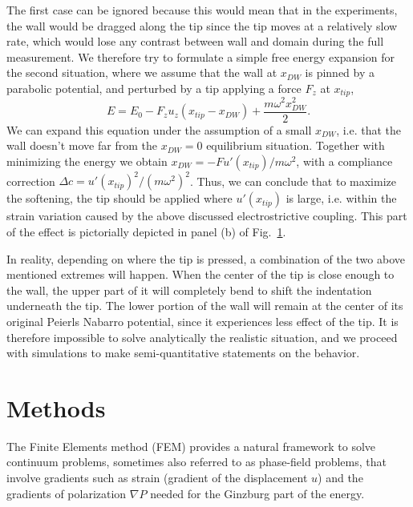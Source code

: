 The first case can be ignored because this would mean that in the experiments, the wall would be dragged along the tip since the tip moves at a relatively slow rate, which would lose any contrast between wall and domain during the full measurement.
We therefore try to formulate a simple free energy expansion for the second situation, where we assume that the wall at $x_{DW}$ is pinned by a parabolic potential, and perturbed by a tip applying a force $F_z$ at $x_{tip}$,
\begin{equation}
	E = E_0 - F_z u_z (x_{tip} - x_{DW}) + \frac{m\omega^2 x_{DW}^2}{2}.
\end{equation}
We can expand this equation under the assumption of a small $x_{DW}$, i.e. that the wall doesn't move far from the $x_{DW}=0$ equilibrium situation. Together with minimizing the energy we obtain $x_{DW} = -F u'(x_{tip})/m \omega^2$, with a compliance correction $\Delta c = u'(x_{tip})^2/(m\omega^2)^2$. Thus, we can conclude that to maximize the softening, the tip should be applied where $u'(x_{tip})$ is large, i.e. within the strain variation caused by the above discussed electrostrictive coupling. This part of the effect is pictorially depicted in panel (b) of Fig.~\ref{fig:BTO_theory}.

\begin{figure}
	\caption{\label{fig:BTO_theory}}
\end{figure}

In reality, depending on where the tip is pressed, a combination of the two above mentioned extremes will happen.
When the center of the tip is close enough to the wall, the upper part of it will completely bend to shift the indentation underneath the tip.
The lower portion of the wall will remain at the center of its original Peierls Nabarro potential, since it experiences less effect of the tip.
It is therefore impossible to solve analytically the realistic situation, and we proceed with simulations to make semi-quantitative statements on the behavior.

\section{Methods}
The Finite Elements method (FEM) provides a natural framework to solve continuum problems, sometimes also referred to as phase-field problems, that involve gradients such as strain (gradient of the displacement $u$) and the gradients of polarization $\nabla P$ needed for the Ginzburg part of the energy\cite{Biner}.

